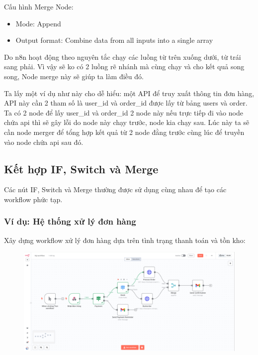 Cấu hình Merge Node:
\begin{itemize}
  \item Mode: Append
  \item Output format: Combine data from all inputs into a single array
\end{itemize}

Do n8n hoạt động theo nguyên tắc chạy các luồng từ trên xuống dưới, từ trái sang phải. Vì vậy sẽ ko có 2 luồng rẽ nhánh mà cùng chạy và cho kết quả song song, Node merge này sẽ giúp ta làm điều đó. 


Ta lấy một ví dụ như này cho dễ hiểu: một API để truy xuất thông tin đơn hàng, API này cần 2 tham số là user\_id và order\_id được lấy từ bảng users và order. Ta có 2 node để lấy user\_id và order\_id 2 node này nếu trực tiếp đi vào node chứa api thì sẽ gây lỗi do node này chạy trước, node kia chạy sau. Lúc này ta sẽ cần node merger để tổng hợp kết quả từ 2 node đằng trước cùng lúc để truyền vào node chứa api sau đó.

\clearpage
\subsection{Kết hợp IF, Switch và Merge}

Các nút IF, Switch và Merge thường được sử dụng cùng nhau để tạo các workflow phức tạp.

\subsubsection{Ví dụ: Hệ thống xử lý đơn hàng}

Xây dựng workflow xử lý đơn hàng dựa trên tình trạng thanh toán và tồn kho:

\begin{figure}[htbp]
    \centering
    \includegraphics[width=1\linewidth]{Chap1-7/stock.pdf}
\end{figure}

